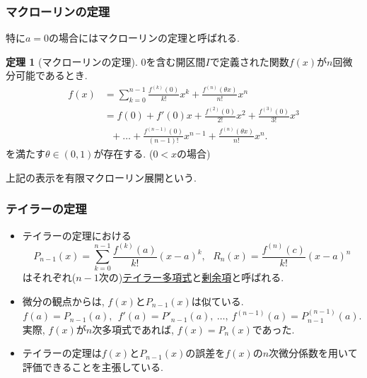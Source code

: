 \documentclass[dvipdfmx,cjk,10.2pt]{beamer}
\theoremstyle{definition}
\newtheorem{Thm}{定理}[section]
\begin{document}
\begin{frame}
\frametitle{マクローリンの定理}


特に$a=0$の場合にはマクローリンの定理と呼ばれる. 


\begin{Thm}[マクローリンの定理]  \label{マクローリン}
$0$を含む開区間$I$で定義された関数$f(x)$が$n$回微分可能であるとき. 
 \begin{align*}
f(x) & = \sum_{k=0}^{n-1}\frac{f^{(k)}(0)}{k!}x^k + \frac{f^{(n)}(\theta x)}{n!}x^n \\
& =  f(0)+ f'(0)x + \frac{f^{(2)}(0)}{2!}x^2  + \frac{f^{(3)}(0)}{3!}x^3 \\
& \ \ \ + \dots + \frac{f^{(n-1)}(0)}{(n-1)!}x^{n-1}+\frac{f^{(n)}(\theta x)}{n!}x^n . 
\end{align*}
を満たす$\theta \in (0,1)$が存在する. ($0<x$の場合) 
\end{Thm}
上記の表示を有限マクローリン展開という.

\end{frame}





\begin{frame}
\frametitle{テイラーの定理}


\begin{itemize}
\item テイラーの定理における
$$
P_{n-1}(x)=\sum_{k=0}^{n-1}\frac{f^{(k)}(a)}{k!}(x-a)^k, \ \ \ 
R_n(x)=\frac{f^{(n)}(c)}{k!}(x-a)^n
$$
はそれぞれ($n-1$次の)\underline{テイラー多項式}と\underline{剰余項}と呼ばれる. 
\item 微分の観点からは, $f(x)$と$P_{n-1}(x)$は似ている. 
$$
f(a)=P_{n-1}(a), \ \ f '(a)=P'_{n-1}(a), \ \dots, \  f^{(n-1)}(a)=P^{(n-1)}_{n-1}(a). 
$$
実際, $f(x)$が$n$次多項式であれば, $f(x)=P_n(x)$であった. 
\item テイラーの定理は$f(x)$と$P_{n-1}(x)$の誤差を$f(x)$の$n$次微分係数を用いて評価できることを主張している. 
\end{itemize}

\end{frame}



\end{document}

